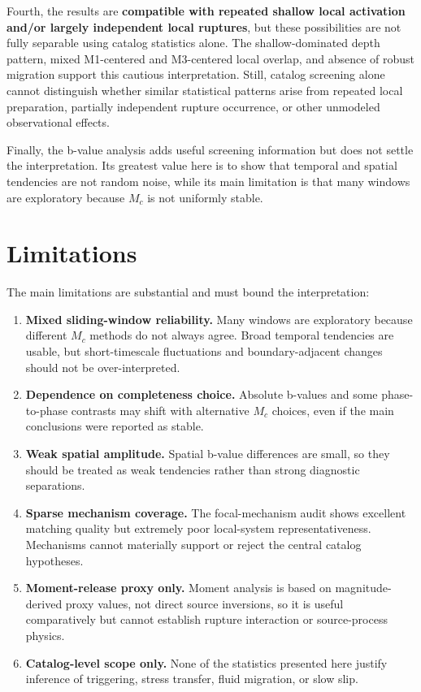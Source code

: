 \documentclass[11pt]{article}
\begin{document}
Fourth, the results are \textbf{compatible with repeated shallow local activation and/or largely independent local ruptures}, but these possibilities are not fully separable using catalog statistics alone. The shallow-dominated depth pattern, mixed M1-centered and M3-centered local overlap, and absence of robust migration support this cautious interpretation. Still, catalog screening alone cannot distinguish whether similar statistical patterns arise from repeated local preparation, partially independent rupture occurrence, or other unmodeled observational effects.

Finally, the b-value analysis adds useful screening information but does not settle the interpretation. Its greatest value here is to show that temporal and spatial tendencies are not random noise, while its main limitation is that many windows are exploratory because $M_c$ is not uniformly stable.

\section{Limitations}
The main limitations are substantial and must bound the interpretation:
\begin{enumerate}[leftmargin=2em]
    \item \textbf{Mixed sliding-window reliability.} Many windows are exploratory because different $M_c$ methods do not always agree. Broad temporal tendencies are usable, but short-timescale fluctuations and boundary-adjacent changes should not be over-interpreted.
    \item \textbf{Dependence on completeness choice.} Absolute b-values and some phase-to-phase contrasts may shift with alternative $M_c$ choices, even if the main conclusions were reported as stable.
    \item \textbf{Weak spatial amplitude.} Spatial b-value differences are small, so they should be treated as weak tendencies rather than strong diagnostic separations.
    \item \textbf{Sparse mechanism coverage.} The focal-mechanism audit shows excellent matching quality but extremely poor local-system representativeness. Mechanisms cannot materially support or reject the central catalog hypotheses.
    \item \textbf{Moment-release proxy only.} Moment analysis is based on magnitude-derived proxy values, not direct source inversions, so it is useful comparatively but cannot establish rupture interaction or source-process physics.
    \item \textbf{Catalog-level scope only.} None of the statistics presented here justify inference of triggering, stress transfer, fluid migration, or slow slip.
\end{enumerate}
\end{document}
